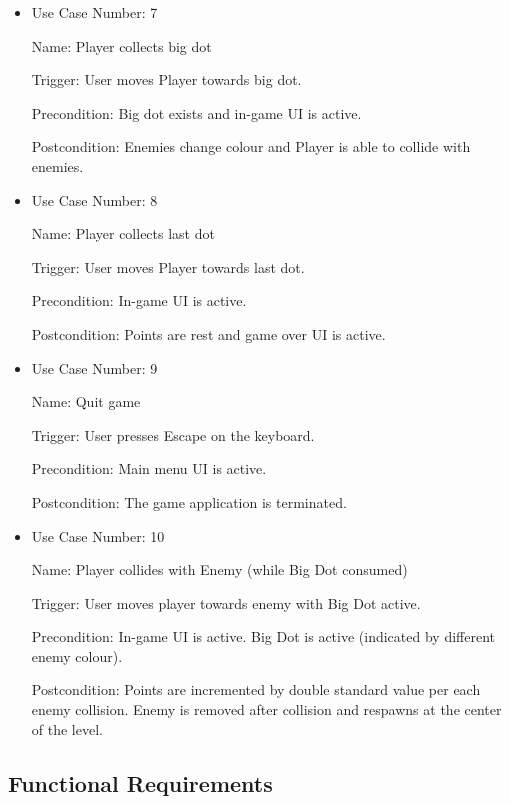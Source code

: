 \documentclass[12pt, titlepage]{article}
\begin{document}
\begin{itemize}
\item
Use Case Number: 7

Name: Player collects big dot

Trigger: User moves Player towards big dot.

Precondition: Big dot exists and in-game UI is active.

Postcondition: Enemies change colour and Player is able to collide with enemies.
\end{itemize}

\begin{itemize}
\item
Use Case Number: 8

Name: Player collects last dot

Trigger: User moves Player towards last dot.

Precondition: In-game UI is active.

Postcondition: Points are rest and game over UI is active.
\end{itemize}

\begin{itemize}
\item
Use Case Number: 9

Name: Quit game

Trigger: User presses Escape on the keyboard.

Precondition: Main menu UI is active.

Postcondition: The game application is terminated.
\end{itemize}

\begin{itemize}
\item
Use Case Number: 10

Name: Player collides with Enemy (while Big Dot consumed)

Trigger: User moves player towards enemy with Big Dot active.

Precondition: In-game UI is active. Big Dot is active (indicated by different enemy colour).

Postcondition: Points are incremented by double standard value per each enemy collision. Enemy is removed after collision and respawns at the center of the level.
\end{itemize}


\subsection{Functional Requirements}
\end{document}
